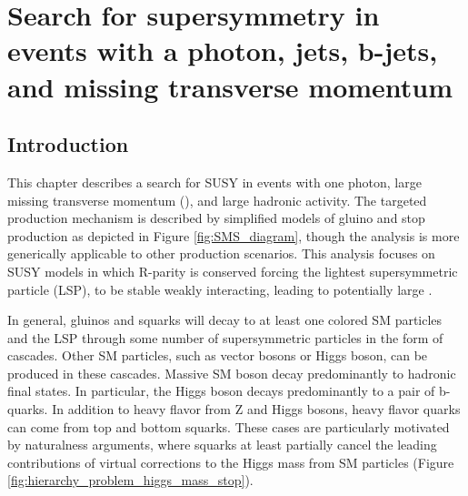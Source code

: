 \chapter[SUSY search with photon]{Search for supersymmetry in events with a photon, jets, b-jets, and missing transverse momentum}
\label{Chap3}
\section{Introduction}
This chapter describes a search for SUSY in events with one photon, large missing transverse momentum (\ptmiss), 
and large hadronic activity.  The targeted production mechanism is described by simplified models of gluino and stop
production as depicted in Figure \ref{fig:SMS_diagram}, though the analysis is 
more generically applicable to other production scenarios.  This analysis
focuses on SUSY models in which R-parity is conserved forcing the lightest supersymmetric particle (LSP), to 
be stable weakly interacting, leading to potentially large \ptmiss.  


In general, gluinos and squarks will decay to at least one colored SM particles and the LSP through some number of
supersymmetric particles in the form of cascades.  Other SM particles, such as vector bosons or Higgs boson, can be 
produced in these cascades.  Massive SM boson decay predominantly to hadronic final states.  In particular, 
the Higgs boson decays predominantly to a pair of b-quarks.  In addition to heavy flavor from Z and Higgs bosons, 
heavy flavor quarks can come from top and bottom squarks.  These cases are particularly motivated by naturalness 
arguments, where squarks at least partially cancel the leading contributions of virtual corrections to the 
Higgs mass from SM particles (Figure \ref{fig:hierarchy_problem_higgs_mass_stop}).  

